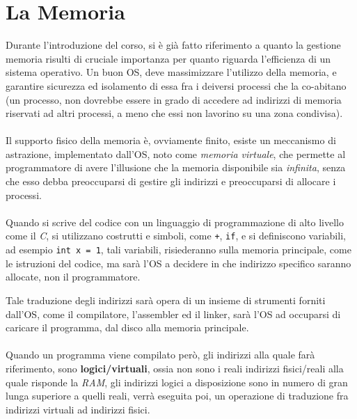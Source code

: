 \documentclass[12pt, letterpaper]{article}
\newcommand{\code}[1]{\colorbox{light-gray}{\texttt{#1}}}
\newcommand{\acc}{\\\hphantom{}\\}
\begin{document}
\section{La Memoria}
Durante l'introduzione del corso, si è già fatto riferimento a quanto la gestione memoria risulti di cruciale 
importanza per quanto riguarda l'efficienza di un sistema operativo. Un buon OS, deve massimizzare l'utilizzo della 
memoria, e garantire sicurezza ed isolamento di essa fra i deiversi processi che la co-abitano (un processo, non 
dovrebbe essere in grado di accedere ad indirizzi di memoria riservati ad altri processi, a meno che essi non lavorino 
su una zona condivisa).\acc 
Il supporto fisico della memoria è, ovviamente finito, esiste un meccanismo di astrazione, implementato 
dall'OS, noto come \textit{memoria virtuale}, che permette al programmatore di avere l'illusione che la memoria 
disponibile sia \textit{infinita}, senza che esso debba preoccuparsi di gestire gli indirizzi e preoccuparsi di 
allocare i processi.\acc 
Quando si scrive del codice con un linguaggio di programmazione di alto livello come il \textit{C}, si utilizzano 
costrutti e simboli, come \code{+}, \code{if}, e si definiscono variabili, ad esempio \code{int x = 1}, tali variabili, 
risiederanno sulla memoria principale, come le istruzioni del codice, ma sarà l'OS a decidere in che indirizzo specifico saranno allocate, non il 
programmatore.

Tale traduzione degli indirizzi sarà opera di un insieme di strumenti forniti dall'OS, come il compilatore, l'assembler 
ed il linker, sarà l'OS ad occuparsi di caricare il programma, dal disco alla memoria principale.\acc 
Quando un programma viene compilato però, gli indirizzi alla quale farà riferimento, sono \textbf{logici/virtuali}, ossia 
non sono i reali indirizzi fisici/reali alla quale risponde la \textit{RAM}, gli indirizzi logici a disposizione sono in numero di gran 
lunga superiore a quelli reali, verrà eseguita poi, un operazione di traduzione fra indirizzi virtuali ad indirizzi fisici.
\end{document}
